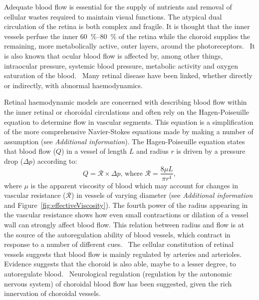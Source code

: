 \documentclass[12pt,a4paper]{journal}
\begin{document}
Adequate blood flow is essential for the supply of nutrients and removal of cellular wastes required to maintain visual functions.
The atypical dual circulation of the retina is both complex and fragile.
It is thought that the inner vessels perfuse the inner \SIrange{60}{80}{\percent} of the retina while the choroid supplies the remaining, more metabolically active, outer layers, around the photoreceptors.~\cite{Birol_2007}
It is also known that ocular blood flow is affected by, among other things, intraocular pressure, systemic blood pressure, metabolic activity and oxygen saturation of the blood.~\cite{Birol_2007,McCullough_1997,Palkovits_2014,Polska_2007,Pournaras_2008,Riva_1997,Wang_2014}
Many retinal disease have been linked, whether directly or indirectly, with abnormal haemodynamics.~\cite{Hayreh_2004,Medina_2016}

Retinal haemodynamic models are concerned with describing blood flow within the inner retinal or choroidal circulations and often rely on the Hagen-Poiseuille equation to determine flow in vascular segments.
This equation is a simplification of the more comprehensive Navier-Stokes equations made by making a number of assumption (see \textit{Additional information}).
The Hagen-Poiseuille equation states that blood flow ($Q$) in a vessel of length $L$ and radius $r$ is driven by a pressure drop ($\Delta p$) according to:
\begin{equation*}
  \label{eq:Hagen-Poiseuille}
  Q = \mathcal R\times\Delta p \mbox{, where } \mathcal{R} = \frac{8\mu L}{\pi r^4},
\end{equation*}
where $\mu$ is the apparent viscosity of blood which may account for changes in vascular resistance ($\mathcal R$) in vessels of varying diameter (see \textit{Additional information} and Figure~\ref{fig:effectiveViscosity}).
The fourth power of the radius appearing in the vascular resistance shows how even small contractions or dilation of a vessel wall can strongly affect blood flow.
This relation between radius and flow is at the source of the autoregulation ability of blood vessels, which contract in response to a number of different cues.~\cite{Kur_2012}
The cellular constitution of retinal vessels suggests that blood flow is mainly regulated by arteries and arterioles.~\cite{An_2020,Kur_2012}
Evidence suggests that the choroid is also able, maybe to a lesser degree, to autoregulate blood.~\cite{Polska_2007,Riva_1997}
Neurological regulation (regulation by the autonomic nervous system) of choroidal blood flow has been suggested, given the rich innervation of choroidal vessels.~\cite{BeharCohen_2020,Polska_2007}
\end{document}
